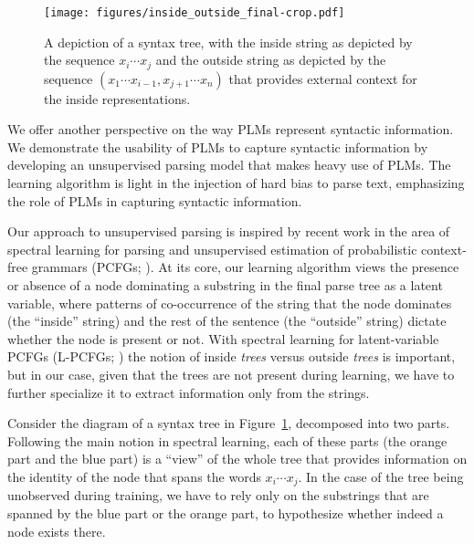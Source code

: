 \documentclass[11pt]{article}
\begin{document}
\begin{figure}[t]
    \centering
     \texttt{[image: figures/inside\_outside\_final-crop.pdf]}
    \caption{A depiction of a syntax tree, with the inside string as depicted by the sequence $x_i \cdots x_j$ and the outside string as depicted by the sequence $(x_1 \cdots x_{i-1}, x_{j+1} \cdots x_n)$ that provides external context for the inside representations.}
    \label{fig:io-tree}
\end{figure}


We offer another perspective on the way PLMs represent syntactic information. We demonstrate the usability of PLMs to capture syntactic information by developing an unsupervised parsing model that makes heavy use of PLMs. The learning algorithm is light in the injection of hard bias to parse text, emphasizing the role of PLMs in capturing syntactic information.

Our approach to unsupervised parsing is inspired by recent work in the area of spectral learning for parsing \citep{JMLR:v15:cohen14a, cohen-etal-2013-experiments} and unsupervised estimation of probabilistic context-free grammars (PCFGs; \citealp{clark-fijalkow-2020-consistent}). At its core, our learning algorithm views the presence or absence of a node dominating a substring in the final parse tree as a latent variable, where patterns of co-occurrence of the string that the node dominates (the ``inside'' string) and the rest of the sentence (the ``outside'' string) dictate whether the node is present or not. With spectral learning for latent-variable PCFGs (L-PCFGs; \citealp{JMLR:v15:cohen14a,cohen-collins-2014-provably}) the notion of inside \emph{trees} versus outside \emph{trees} is important, but in our case, given that the trees are not present during learning, we have to further specialize it to extract information only from the strings.

Consider the diagram of a syntax tree in Figure~\ref{fig:io-tree}, decomposed into two parts. Following the main notion in spectral learning, each of these parts (the orange part and the blue part) is a ``view'' of the whole tree that provides information on the identity of the node that spans the words $x_i \cdots x_j$. In the case of the tree being unobserved during training, we have to rely only on the substrings that are spanned by the blue part or the orange part, to hypothesize whether indeed a node exists there.
\end{document}

